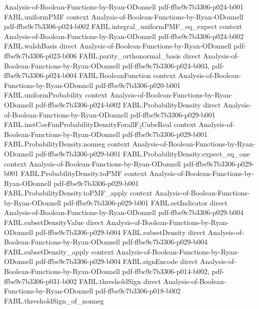 \begin{theorem}
  {Analysis-of-Boolean-Functions-by-Ryan-ODonnell}
  {pdf-ffbe9c7b3306-p024-b001}
\proofstep
  {FABL.uniformPMF}
  {context}
  {Analysis-of-Boolean-Functions-by-Ryan-ODonnell}
  {pdf-ffbe9c7b3306-p024-b002}
\proofstep
  {FABL.integral_uniformPMF_eq_expect}
  {context}
  {Analysis-of-Boolean-Functions-by-Ryan-ODonnell}
  {pdf-ffbe9c7b3306-p024-b002}
\proofstep
  {FABL.walshBasis}
  {direct}
  {Analysis-of-Boolean-Functions-by-Ryan-ODonnell}
  {pdf-ffbe9c7b3306-p023-b006}
\proofstep
  {FABL.parity_orthonormal_basis}
  {direct}
  {Analysis-of-Boolean-Functions-by-Ryan-ODonnell}
  {pdf-ffbe9c7b3306-p024-b003,
    pdf-ffbe9c7b3306-p024-b004}
\proofstep
  {FABL.BooleanFunction}
  {context}
  {Analysis-of-Boolean-Functions-by-Ryan-ODonnell}
  {pdf-ffbe9c7b3306-p020-b001}
\proofstep
  {FABL.uniformProbability}
  {context}
  {Analysis-of-Boolean-Functions-by-Ryan-ODonnell}
  {pdf-ffbe9c7b3306-p024-b002}
\proofstep
  {FABL.ProbabilityDensity}
  {direct}
  {Analysis-of-Boolean-Functions-by-Ryan-ODonnell}
  {pdf-ffbe9c7b3306-p029-b001}
\proofstep
  {FABL.instCoeFunProbabilityDensityForallF₂CubeReal}
  {context}
  {Analysis-of-Boolean-Functions-by-Ryan-ODonnell}
  {pdf-ffbe9c7b3306-p029-b001}
\proofstep
  {FABL.ProbabilityDensity.nonneg}
  {context}
  {Analysis-of-Boolean-Functions-by-Ryan-ODonnell}
  {pdf-ffbe9c7b3306-p029-b001}
\proofstep
  {FABL.ProbabilityDensity.expect_eq_one}
  {context}
  {Analysis-of-Boolean-Functions-by-Ryan-ODonnell}
  {pdf-ffbe9c7b3306-p029-b001}
\proofstep
  {FABL.ProbabilityDensity.toPMF}
  {context}
  {Analysis-of-Boolean-Functions-by-Ryan-ODonnell}
  {pdf-ffbe9c7b3306-p029-b001}
\proofstep
  {FABL.ProbabilityDensity.toPMF_apply}
  {context}
  {Analysis-of-Boolean-Functions-by-Ryan-ODonnell}
  {pdf-ffbe9c7b3306-p029-b001}
\proofstep
  {FABL.setIndicator}
  {direct}
  {Analysis-of-Boolean-Functions-by-Ryan-ODonnell}
  {pdf-ffbe9c7b3306-p029-b004}
\proofstep
  {FABL.subsetDensityValue}
  {direct}
  {Analysis-of-Boolean-Functions-by-Ryan-ODonnell}
  {pdf-ffbe9c7b3306-p029-b004}
\proofstep
  {FABL.subsetDensity}
  {direct}
  {Analysis-of-Boolean-Functions-by-Ryan-ODonnell}
  {pdf-ffbe9c7b3306-p029-b004}
\proofstep
  {FABL.subsetDensity_apply}
  {context}
  {Analysis-of-Boolean-Functions-by-Ryan-ODonnell}
  {pdf-ffbe9c7b3306-p029-b004}
\proofstep
  {FABL.signEncode}
  {direct}
  {Analysis-of-Boolean-Functions-by-Ryan-ODonnell}
  {pdf-ffbe9c7b3306-p014-b002,
    pdf-ffbe9c7b3306-p031-b002}
\proofstep
  {FABL.thresholdSign}
  {direct}
  {Analysis-of-Boolean-Functions-by-Ryan-ODonnell}
  {pdf-ffbe9c7b3306-p018-b002}
\proofstep
  {FABL.thresholdSign_of_nonneg}

\end{theorem}
